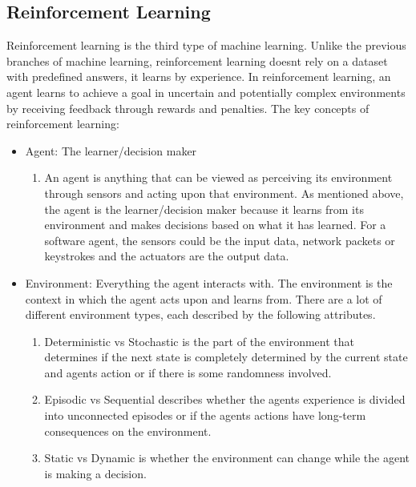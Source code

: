\subsection{Reinforcement Learning}
Reinforcement learning is the third type of machine learning.
Unlike the previous branches of machine learning,
reinforcement learning doesnt rely on a dataset with predefined answers, it learns by experience.
In reinforcement learning, an agent learns to achieve a goal in
uncertain and potentially complex environments by receiving feedback
through rewards and penalties. \cite{RL-GeeksForGeeks}
\newline
The key concepts of reinforcement learning:
\begin{itemize}
      \item Agent: The learner/decision maker
            \begin{enumerate}
                  \item An agent is anything that can be viewed as perceiving its environment through
                        sensors and acting upon that environment. As mentioned above, the agent is the learner/decision maker because it
                        learns from its environment and makes decisions based on what it has learned.
                        For a software agent, the sensors could be the input data, network packets or keystrokes
                        and the actuators are the output data. \cite{IntelligentAgents}
            \end{enumerate}
      \item Environment: Everything the agent interacts with. The environment is the context in which the agent acts upon and learns from.
            There are a lot of different environment types, each described by the following attributes. \cite{IntelligentAgents}
            \begin{enumerate}
                  \item Deterministic vs Stochastic is the part of the environment that determines if the next state is completely
                        determined by the current state and agents action or if there is some randomness involved.
                  \item Episodic vs Sequential describes whether the agents experience is divided into unconnected episodes or
                        if the agents actions have long-term consequences on the environment.
                  \item Static vs Dynamic is whether the environment can change while the agent is making a decision.

\end{enumerate}
\end{itemize}
